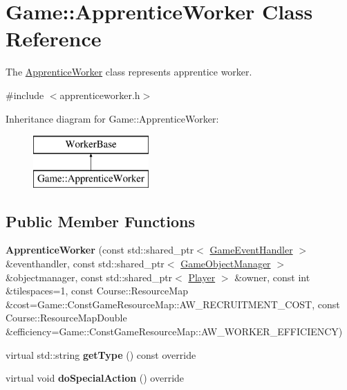 \hypertarget{class_game_1_1_apprentice_worker}{\section{Game\-:\-:Apprentice\-Worker Class Reference}
\label{class_game_1_1_apprentice_worker}
}


The \hyperlink{class_game_1_1_apprentice_worker}{Apprentice\-Worker} class represents apprentice worker.  




{\ttfamily \#include $<$apprenticeworker.\-h$>$}

Inheritance diagram for Game\-:\-:Apprentice\-Worker\-:\begin{figure}[H]
\begin{center}
\leavevmode
\includegraphics[height=2.000000cm]{class_game_1_1_apprentice_worker}
\end{center}
\end{figure}
\subsection*{Public Member Functions}
\begin{DoxyCompactItemize}
\item 
\hypertarget{class_game_1_1_apprentice_worker_adc6d74ea0acbe8d2237798f256da77ea}{{\bfseries Apprentice\-Worker} (const std\-::shared\-\_\-ptr$<$ \hyperlink{class_game_1_1_game_event_handler}{Game\-Event\-Handler} $>$ \&eventhandler, const std\-::shared\-\_\-ptr$<$ \hyperlink{class_game_1_1_game_object_manager}{Game\-Object\-Manager} $>$ \&objectmanager, const std\-::shared\-\_\-ptr$<$ \hyperlink{class_game_1_1_player}{Player} $>$ \&owner, const int \&tilespaces=1, const Course\-::\-Resource\-Map \&cost=Game\-::\-Const\-Game\-Resource\-Map\-::\-A\-W\-\_\-\-R\-E\-C\-R\-U\-I\-T\-M\-E\-N\-T\-\_\-\-C\-O\-S\-T, const Course\-::\-Resource\-Map\-Double \&efficiency=Game\-::\-Const\-Game\-Resource\-Map\-::\-A\-W\-\_\-\-W\-O\-R\-K\-E\-R\-\_\-\-E\-F\-F\-I\-C\-I\-E\-N\-C\-Y)}\label{class_game_1_1_apprentice_worker_adc6d74ea0acbe8d2237798f256da77ea}

\item 
\hypertarget{class_game_1_1_apprentice_worker_a2389f730db34c05be7dc9bf12e59cc24}{virtual std\-::string {\bfseries get\-Type} () const override}\label{class_game_1_1_apprentice_worker_a2389f730db34c05be7dc9bf12e59cc24}

\item 
\hypertarget{class_game_1_1_apprentice_worker_a0abe6c56acd1e8a876a367e6173e6ca8}{virtual void {\bfseries do\-Special\-Action} () override}\label{class_game_1_1_apprentice_worker_a0abe6c56acd1e8a876a367e6173e6ca8}

\end{DoxyCompactItemize}


